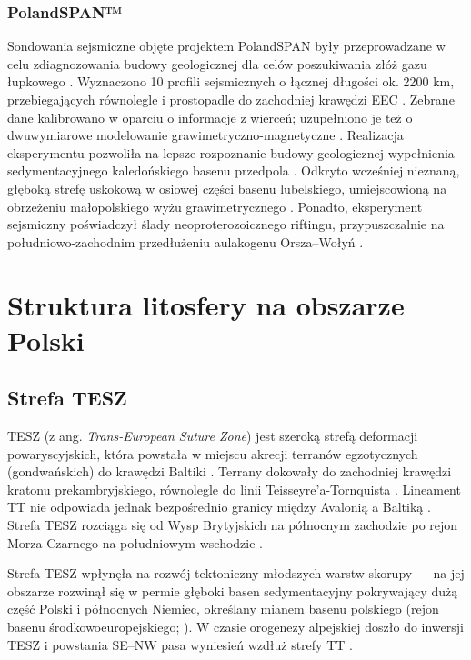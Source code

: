 \documentclass[11.5pt,twoside]{report}
\begin{document}
\subsubsection{PolandSPAN™}
Sondowania sejsmiczne objęte projektem PolandSPAN były przeprowadzane w celu zdiagnozowania budowy geologicznej dla celów poszukiwania złóż gazu łupkowego \parencite{Krzywiec.2014}. Wyznaczono 10 profili sejsmicznych o łącznej długości ok. 2200 km, przebiegających równolegle i prostopadle do zachodniej krawędzi EEC \parencite{Krzywiec.2014}. Zebrane dane kalibrowano w oparciu o informacje z wierceń; uzupełniono je też o dwuwymiarowe modelowanie grawimetryczno-magnetyczne \parencite{Krzywiec.2014}. Realizacja eksperymentu pozwoliła na lepsze rozpoznanie budowy geologicznej wypełnienia sedymentacyjnego kaledońskiego basenu przedpola \parencite{Krzywiec.2014}. Odkryto wcześniej nieznaną, głęboką strefę uskokową w osiowej części basenu lubelskiego, umiejscowioną na obrzeżeniu małopolskiego wyżu grawimetrycznego \parencite{Krzywiec.2014}. Ponadto, eksperyment sejsmiczny poświadczył ślady neoproterozoicznego riftingu, przypuszczalnie na południowo-zachodnim przedłużeniu aulakogenu Orsza--Wołyń \parencite{Krzywiec.2014,Poprawa.2002}. 


\section{Struktura litosfery na obszarze Polski}

\subsection{Strefa TESZ}
TESZ (z ang. \textit{Trans-European Suture Zone}) jest szeroką strefą deformacji powaryscyjskich, która powstała w miejscu akrecji terranów egzotycznych (gondwańskich) do krawędzi Baltiki \parencite{Belka.2002,Guterch.1998}. Terrany dokowały do zachodniej krawędzi kratonu prekambryjskiego, równolegle do linii Teisseyre'a-Tornquista \parencite{Belka.2002}. Lineament TT nie odpowiada jednak bezpośrednio granicy między Avalonią a Baltiką \parencite{Mizerski.2017,Mazur.2015}. Strefa TESZ rozciąga się od Wysp Brytyjskich na północnym zachodzie po rejon Morza Czarnego na południowym wschodzie \parencite{Guterch.1998}. 

Strefa TESZ wpłynęła na rozwój tektoniczny młodszych warstw skorupy --- na jej obszarze rozwinął się w permie głęboki basen sedymentacyjny pokrywający dużą część Polski i północnych Niemiec, określany mianem basenu polskiego (rejon basenu środkowoeuropejskiego; \cite{Guterch.1998}). W czasie orogenezy alpejskiej doszło do inwersji TESZ i powstania SE--NW pasa wyniesień wzdłuż strefy TT \parencite{Guterch.1998}.
\end{document}
